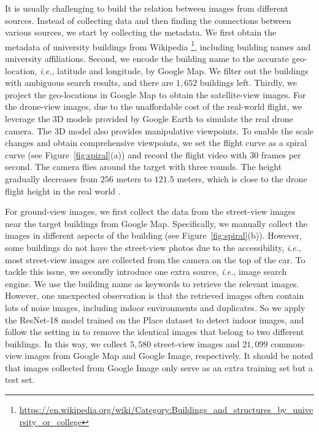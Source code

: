 \documentclass[sigconf]{acmart}
\def\ie{\emph{i.e.}}
\begin{document}
It is usually challenging to build the relation between images from different sources. Instead of collecting data and then finding the connections between various sources, we start by collecting the metadata. We first obtain the metadata of university buildings from Wikipedia \footnote{\url{https://en.wikipedia.org/wiki/Category:Buildings_and_structures_by_university_or_college}}, including building names and university affiliations. Second, we encode the building name to the accurate geo-location, \ie, latitude and longitude, by Google Map. We filter out the buildings with ambiguous search results, and there are $1,652$ buildings left. 
Thirdly, we project the geo-locations in Google Map to obtain the satellite-view images. For the drone-view images, due to the unaffordable cost of the real-world flight, we leverage the 3D models provided by Google Earth to simulate the real drone camera. The 3D model also provides manipulative viewpoints. To enable the scale changes and obtain comprehensive viewpoints, we set the flight curve as a spiral curve (see Figure~\ref{fig:spiral}(a)) and record the flight video with 30 frames per second. The camera flies around the target with three rounds. The height gradually decreases from $256$ meters to $121.5$ meters, which is close to the drone flight height in the real world \cite{rule2015airspace, brar2015drones}.

For ground-view images, we first collect the data from the street-view images near the target buildings from Google Map. Specifically, we manually collect the images in different aspects of the building (see Figure~\ref{fig:spiral}(b)). 
However, some buildings do not have the street-view photos due to the accessibility, \ie, most street-view images are collected from the camera on the top of the car. To tackle this issue, we secondly introduce one extra source, \ie, image search engine. We use the building name as keywords to retrieve the relevant images. However, one unexpected observation is that the retrieved images often contain lots of noise images, including indoor environments and duplicates. So we apply the ResNet-18 model trained on the Place dataset \cite{zhou2017places} to detect indoor images, and follow the setting in \cite{krause2016unreasonable} to remove the identical images that belong to two different buildings. In this way, we collect $5,580$ street-view images and $21,099$ common-view images from Google Map and Google Image, respectively.
It should be noted that images collected from Google Image only serve as an extra training set but a test set. 
\end{document}
